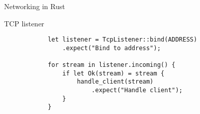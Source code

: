 \begin{frame}[fragile]{Networking in Rust}
    \begin{block}{TCP listener}
        \begin{verbatim}
            let listener = TcpListener::bind(ADDRESS)
                .expect("Bind to address");
            
            for stream in listener.incoming() {
                if let Ok(stream) = stream {
                    handle_client(stream)
                        .expect("Handle client");
                }
            }
        \end{verbatim}
    \end{block}
\end{frame}
